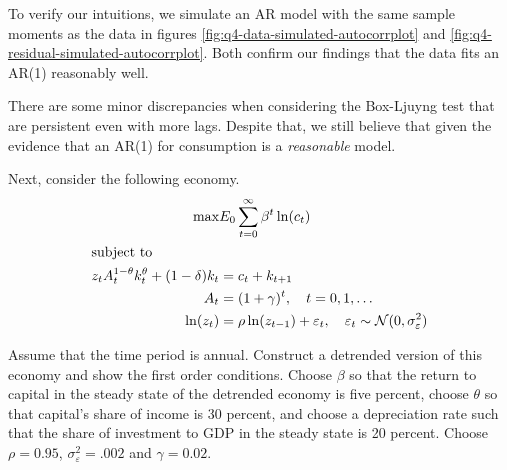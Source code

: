 \documentclass[11pt]{article}
\begin{document}
\begin{enumerate}
To verify our intuitions, we simulate an AR model with the same sample moments as the data in figures \ref{fig:q4-data-simulated-autocorrplot} and \ref{fig:q4-residual-simulated-autocorrplot}. Both confirm our findings that the data fits an AR(1) reasonably well.

There are some minor discrepancies when considering the Box-Ljuyng test that are persistent even with more lags. Despite that, we still believe that given the evidence that an AR(1) for consumption is a {\itshape reasonable} model.

\newpage
Next, consider the following economy.
\begin{align*}
\max & E_0 \sum^\infty_{t = 0}\beta^t \ln (c_t)\\
\intertext{subject to}
z_t A_t^{1 - \theta} k_t^\theta + (1 - \delta)k_t &= c_t + k_{t + 1}\\
A_t &= (1 + \gamma)^t, \quad t = 0, 1, \ldots \\
\ln(z_t) &= \rho \ln (z_{t - 1}) + \varepsilon_t,\quad \varepsilon_t \sim \mathcal{N}(0, \sigma^2_\varepsilon)
\end{align*}

Assume that the time period is annual. Construct a detrended version of
this economy and show the first order conditions. Choose $\beta$ so that the return
to capital in the steady state of the detrended economy is five percent, choose
$\theta$ so that capital’s share of income is 30 percent, and choose a depreciation rate
such that the share of investment to GDP in the steady state is 20 percent.
Choose $\rho = 0.95$, $\sigma^2_\varepsilon
 = .002$ and $\gamma = 0.02$.


\end{enumerate}
\end{document}
